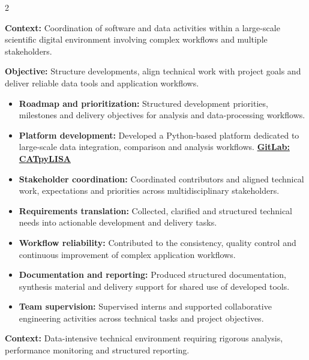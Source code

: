 \documentclass[8pt,a4paper,ragged2e,withhyper]{altacv}
\begin{document}
\begin{paracol}{2}
\divider


\textbf{Context:} Coordination of software and data activities within a large-scale scientific digital environment involving complex workflows and multiple stakeholders.

\textbf{Objective:} Structure developments, align technical work with project goals and deliver reliable data tools and application workflows.

\begin{itemize}
\item \textbf{Roadmap and prioritization:} Structured development priorities, milestones and delivery objectives for analysis and data-processing workflows.
\item \textbf{Platform development:} Developed a Python-based platform dedicated to large-scale data integration, comparison and analysis workflows. \textcolor{DarkPastelRed}{\href{https://gitlab.oca.eu/gboileau/lisa_l3_tools}{\bf GitLab: CATpyLISA}}
\item \textbf{Stakeholder coordination:} Coordinated contributors and aligned technical work, expectations and priorities across multidisciplinary stakeholders.
\item \textbf{Requirements translation:} Collected, clarified and structured technical needs into actionable development and delivery tasks.
\item \textbf{Workflow reliability:} Contributed to the consistency, quality control and continuous improvement of complex application workflows.
\item \textbf{Documentation and reporting:} Produced structured documentation, synthesis material and delivery support for shared use of developed tools.
\item \textbf{Team supervision:} Supervised interns and supported collaborative engineering activities across technical tasks and project objectives.
\end{itemize}

\divider


\textbf{Context:} Data-intensive technical environment requiring rigorous analysis, performance monitoring and structured reporting.


\end{paracol}
\end{document}
